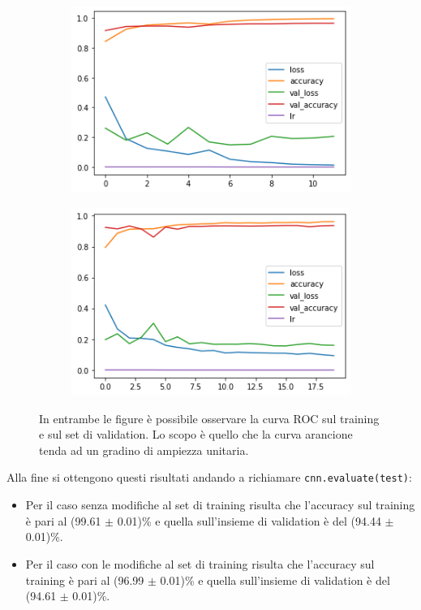   \begin{figure}[H]
    \begin{subfigure}{0.55\textwidth}
      \centering
      \includegraphics[width=0.95\linewidth]{Figures/history-pneumonia-no-aug.png}
      \caption{}
      \label{fig:snap1}
    \end{subfigure}%
    \begin{subfigure}{0.55\textwidth}
      \centering
      \includegraphics[width=.95\linewidth]{Figures/history-pneumonia-aug.png}
      \caption{}
      \label{fig:snap2}
    \end{subfigure}%
    \caption{In entrambe le figure è possibile osservare la curva ROC sul training e sul set di validation. Lo scopo è quello che la curva arancione tenda ad un gradino di ampiezza unitaria.}
    \label{fig:fig}
\end{figure} 
Alla fine si ottengono questi risultati andando a richiamare \lstinline{cnn.evaluate(test)}:
\begin{itemize}
  \item Per il caso senza modifiche al set di training risulta che l'accuracy sul training è pari al (99.61 $\pm$ 0.01)\% e quella sull'insieme di validation è del (94.44 $\pm$ 0.01)\%.
  \item  Per il caso con le modifiche al set di training risulta che l'accuracy sul training è pari al (96.99 $\pm$ 0.01)\% e quella sull'insieme di validation è del (94.61 $\pm$ 0.01)\%.
  
\end{itemize}


